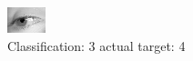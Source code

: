 \begin{figure}[h!]
\begin{center}
\includegraphics[width=0.60\columnwidth]{figures/ID2917_class_3_target_4.png}
\end{center}
\caption{ Classification: 3 actual target: 4}
\label{fig:ID2917_class_3_target_4}
\end{figure}

